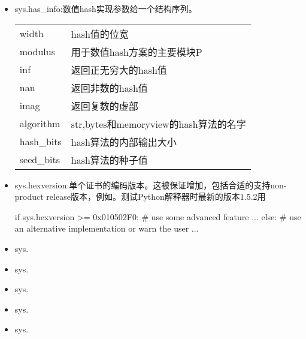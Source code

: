 \begin{itemize}
\item sys.has\_info:数值hash实现参数给一个结构序列。
\begin{tabular}{ll}
width&hash值的位宽\\
modulus&用于数值hash方案的主要模块P\\
inf&返回正无穷大的hash值\\
nan&返回非数的hash值\\
imag&返回复数的虚部\\
algorithm&str,bytes和memoryview的hash算法的名字\\
hash\_bits&hash算法的内部输出大小\\
seed\_bits&hash算法的种子值
\end{tabular}
\item sys.hexversion:单个证书的编码版本。这被保证增加，包括合适的支持non-product release版本，例如。测试Python解释器时最新的版本1.5.2用
\begin{python}
if sys.hexversion >= 0x010502F0:
    # use some advanced feature
    ...
else:
    # use an alternative implementation or warn the user
    ...
\end{python}
\item sys.
\item sys.
\item sys.
\item sys.
\item sys.
\end{itemize}
